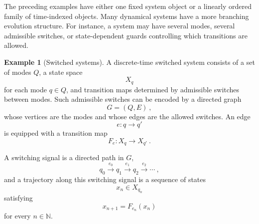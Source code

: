 \documentclass[a4paper,reqno,oneside]{amsart}
\theoremstyle{definition}
\newtheorem{example}[theorem]{Example}
\theoremstyle{remark}
\newcommand{\N}{\mathbb{N}}
\numberwithin{equation}{section}
\begin{document}
	The preceding examples have either one fixed system object or a linearly
	ordered family of time-indexed objects. Many dynamical systems have a more
	branching evolution structure. For instance, a system may have several
	modes, several admissible switches, or state-dependent guards controlling
	which transitions are allowed.
	
	
	\begin{example}[Switched systems]
		A discrete-time switched system consists of a set of modes $Q$, a state space
		\begin{equation}
			X_q
		\end{equation}
		for each mode $q\in Q$, and transition maps determined by admissible
		switches between modes. Such admissible switches can be encoded by a
		directed graph
		\begin{equation}
			G=(Q,E) \ ,
		\end{equation}
		whose vertices are the modes and whose edges are the allowed switches. An
		edge
		\begin{equation}
			e\colon q\longrightarrow q'
		\end{equation}
		is equipped with a transition map
		\begin{equation}
			F_e\colon X_q\longrightarrow X_{q'} \ .
		\end{equation}
		
		A switching signal is a directed path in $G$,
		\begin{equation}
			q_0\xrightarrow{e_0}q_1\xrightarrow{e_1}q_2
			\xrightarrow{e_2}\cdots \ ,
		\end{equation}
		and a trajectory along this switching signal is a sequence of states
		\begin{equation}
			x_n\in X_{q_n}
		\end{equation}
		satisfying
		\begin{equation}
			x_{n+1}=F_{e_n}(x_n)
		\end{equation}
		for every $n\in\N$.
		

\end{example}
\end{document}
